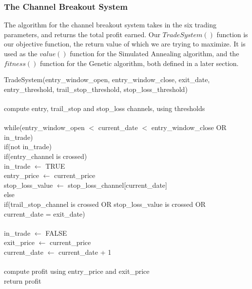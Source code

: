 \documentclass[12pt]{article}
\begin{document}
\subsubsection{The Channel Breakout System}

The algorithm for the channel breakout system takes in the six trading
parameters, and returns the total profit earned. Our $TradeSystem()$ function
is our objective function, the return value of which we are trying to maximize.
It is used as the $value()$ function for the Simulated Annealing algorithm, and
the $fitness()$ function for the Genetic algorithm, both defined in a later
section.
\vspace{25pt}

\setlength{\parindent}{5mm}
\indent TradeSystem(entry\_window\_open, entry\_window\_close, exit\_date,\\
\indent \indent \indent \indent \indent entry\_threshold, trail\_stop\_threshold, stop\_loss\_threshold)\\\\
\indent \indent compute entry, trail\_stop and stop\_loss channels, using thresholds\\\\
\indent \indent while(entry\_window\_open $<$ current\_date $<$ entry\_window\_close OR in\_trade)\\
\indent \indent \indent if(not in\_trade)\\
\indent \indent \indent \indent if(entry\_channel is crossed)\\
\indent \indent \indent \indent \indent in\_trade $\leftarrow$ TRUE\\
\indent \indent \indent \indent \indent entry\_price $\leftarrow$ current\_price\\
\indent \indent \indent \indent \indent stop\_loss\_value $\leftarrow$ stop\_loss\_channel[current\_date]\\
\indent \indent \indent else\\
\indent \indent \indent \indent if(trail\_stop\_channel is crossed OR stop\_loss\_value is crossed OR\\
\indent \indent \indent \indent \indent current\_date = exit\_date)\\\\
\indent \indent \indent \indent \indent in\_trade $\leftarrow$ FALSE\\
\indent \indent \indent \indent \indent exit\_price $\leftarrow$ current\_price\\
\indent \indent \indent current\_date $\leftarrow$ current\_date + 1\\\\
\indent \indent compute profit using entry\_price and exit\_price\\
\indent \indent return profit\\
\setlength{\parindent}{0mm}
\end{document}
